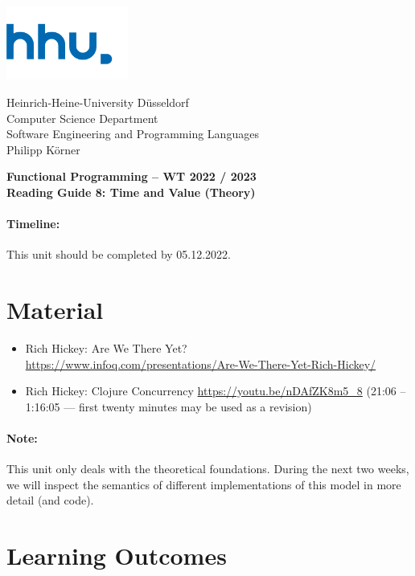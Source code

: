 \documentclass[11pt,a4paper]{article}
\begin{document}
	
\begin{minipage}[b]{\textwidth}
	\parbox[t]{5cm}{%
		\includegraphics[width=4cm]{unilogo}
		\hfill
	}
	\parbox[b]{11cm}{%
		Heinrich-Heine-University D\"usseldorf\\
		Computer Science Department\\
		Software Engineering and Programming Languages\\
		Philipp K\"orner
	}
\end{minipage}
\begin{center}
	\bf
	Functional Programming -- WT 2022 / 2023\\
	Reading Guide 8: Time and Value (Theory)
\end{center}

\pagestyle{empty}

\paragraph{Timeline:} This unit should be completed by 05.12.2022.

\section{Material} 

\begin{itemize}
\item Rich Hickey: Are We There Yet? \\ \url{https://www.infoq.com/presentations/Are-We-There-Yet-Rich-Hickey/}
\item Rich Hickey: Clojure Concurrency \url{https://youtu.be/nDAfZK8m5_8} (21:06 -- 1:16:05 --- first twenty minutes may be used as a revision)
\end{itemize}

\paragraph{Note:} This unit only deals with the theoretical foundations.
During the next two weeks, we will inspect the semantics of different implementations of this model
in more detail (and code).

\section{Learning Outcomes}
\end{document}
